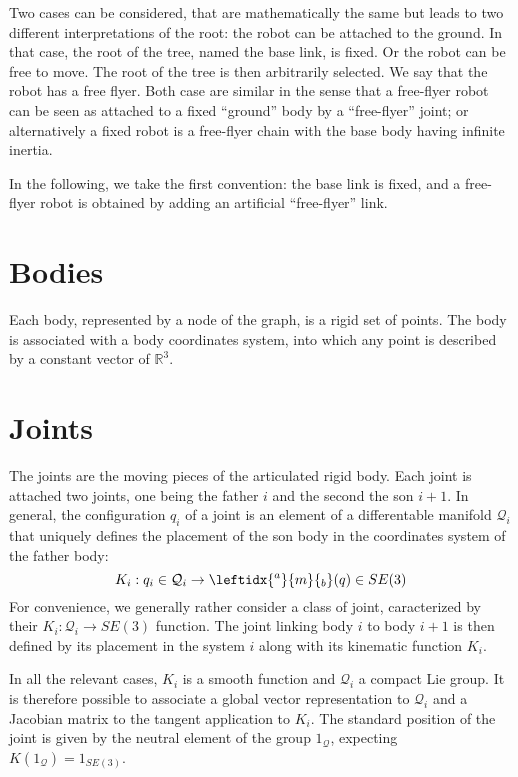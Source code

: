 \documentclass{book}
\begin{document}
Two cases can be considered, that are mathematically the same but leads to two different interpretations of the root: the robot can be attached to the ground. In that case, the root of the tree, named the base link, is fixed. Or the robot can be free to move. The root of the tree is then arbitrarily selected. We say that the robot has a free flyer.
Both case are similar in the sense that a free-flyer robot can be seen as attached to a fixed ``ground'' body by a ``free-flyer'' joint; or alternatively a fixed robot is a free-flyer chain with the base body having infinite inertia.

In the following, we take the first convention: the base link is fixed, and a free-flyer robot is obtained by adding an artificial ``free-flyer'' link.

\section{Bodies}

Each body, represented by a node of the graph, is a rigid set of points. The body is associated with a body coordinates system, into which any point is described by a constant vector of $\mathbb{R}^3$. 

\section{Joints}

The joints are the moving pieces of the articulated rigid body. Each joint is attached two joints, one being the father $i$ and the second the son $i+1$. In general, the configuration $q_i$ of a joint is an element of a differentable manifold $\mathcal{Q}_i$ that uniquely defines the placement of the son body in the coordinates system of the father body:
\[ K_i: q_i \in \mathcal{Q}_i \rightarrow \leftidx{^a}{m}{_b}(q) \in SE(3) \]
For convenience, we generally rather consider a class of joint, caracterized by their $K_i : \mathcal{Q}_i \rightarrow SE(3)$ function. The joint linking body $i$ to body $i+1$ is then defined by its placement in the system $i$ along with its kinematic function $K_i$.

In all the relevant cases, $K_i$ is a smooth function and $\mathcal{Q}_i$ a compact Lie group. It is therefore possible to associate a global vector representation to $\mathcal{Q}_i$ and a Jacobian matrix to the tangent application to $K_i$. The standard position of the joint is given by the neutral element of the group $1_\mathcal{Q}$, expecting $K(1_\mathcal{Q}) = 1_{SE(3)}$.
\end{document}
